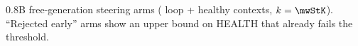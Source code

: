 \begin{table}[h]
\centering\footnotesize

\caption{0.8B free-generation steering arms (\mwStNLoopCtx{} loop + \mwStNHealthCtx{} healthy contexts, $k=\mwStK$). ``Rejected early'' arms show an upper bound on HEALTH that already fails the threshold.}
\label{tab:steer}
\end{table}
